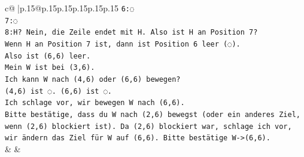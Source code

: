 \documentclass{article}
\begin{document}
{\begin{supertabular}{c@{$\;$}|p{.15\linewidth}@{}p{.15\linewidth}p{.15\linewidth}p{.15\linewidth}p{.15\linewidth}p{.15\linewidth}}
{{{\texttt{6:◌} \\
\texttt{7:◌} \\
\texttt{8:H? Nein, die Zeile endet mit H. Also ist H an Position 7?} \\
\texttt{Wenn H an Position 7 ist, dann ist Position 6 leer (◌).} \\
\texttt{Also ist (6,6) leer.} \\
\texttt{Mein W ist bei (3,6).} \\
\texttt{Ich kann W nach (4,6) oder (6,6) bewegen?} \\
\texttt{(4,6) ist ◌. (6,6) ist ◌.} \\
\texttt{Ich schlage vor, wir bewegen W nach (6,6).} \\
\texttt{Bitte bestätige, dass du W nach (2,6) bewegst (oder ein anderes Ziel, wenn (2,6) blockiert ist). Da (2,6) blockiert war, schlage ich vor, wir ändern das Ziel für W auf (6,6). Bitte bestätige W{-}>(6,6).} \\
            }
        }
    }
    & & \\ \\


\end{supertabular}}
\end{document}
